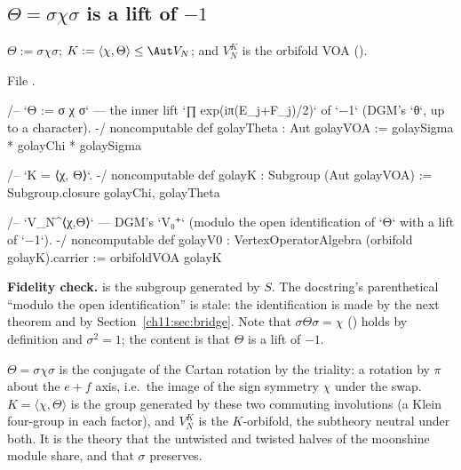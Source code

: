 \subsection{\texorpdfstring{$\Theta=\sigma\chi\sigma$}{Theta} is a lift of \texorpdfstring{$-1$}{-1}}

\begin{definition}\label{ch11:def:golayTheta}
$\Theta:=\sigma\chi\sigma$; $K:=\langle\chi,\Theta\rangle\le\Aut V_N$; and
$V_N^K$ is the orbifold VOA ().
\end{definition}
\noindent File .
\begin{leancode}
/-- `Θ := σ χ σ` — the inner lift `∏ exp(iπ(E_j+F_j)/2)` of `−1` (DGM's `θ`, up to a character). -/
noncomputable def golayTheta : Aut golayVOA := golaySigma * golayChi * golaySigma

/-- `K = ⟨χ, Θ⟩`. -/
noncomputable def golayK : Subgroup (Aut golayVOA) := Subgroup.closure {golayChi, golayTheta}

/-- `V_N^{⟨χ,Θ⟩}` — DGM's `V₀⁺` (modulo the open identification of `Θ` with a lift of `−1`). -/
noncomputable def golayV0 : VertexOperatorAlgebra (orbifold golayK).carrier := orbifoldVOA golayK
\end{leancode}
\begin{dictionary}
\textbf{Fidelity check.}   is the subgroup generated by $S$.  The
docstring's parenthetical ``modulo the open identification'' is stale: the identification is made
by the next theorem and by Section~\ref{ch11:sec:bridge}.  Note that $\sigma\Theta\sigma=\chi$
() holds by definition and $\sigma^2=1$; the content is that $\Theta$ is
a lift of $-1$.
\end{dictionary}

\begin{physics}
$\Theta=\sigma\chi\sigma$ is the conjugate of the Cartan rotation by the triality: a rotation by $\pi$ about the $e+f$ axis, i.e.\ the image of the sign symmetry $\chi$ under the swap. $K=\langle\chi,\Theta\rangle$ is the group generated by these two commuting involutions (a Klein four-group in each factor), and $V_N^K$ is the $K$-orbifold, the subtheory neutral under both. It is the theory that the untwisted and twisted halves of the moonshine module share, and that $\sigma$ preserves.
\end{physics}

